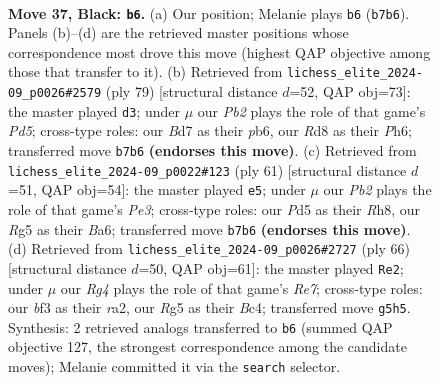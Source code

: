 \documentclass[11pt]{article}
\begin{document}
\clearpage

\begin{figure}[p]\centering
\begin{subfigure}{0.46\textwidth}\centering
\resizebox{\linewidth}{!}{%
\newchessgame
\chessboard[
  setfen={3r1k2/1p1b1p1p/8/p2p2r1/6P1/1P1K1B2/P4N1P/2R3R1 b - - 0 37},
  showmover=false,
  pgfstyle=straightmove, color=movearrow, markmove={b7-b6}
]}
\caption{}
\end{subfigure}\hfill
\begin{subfigure}{0.46\textwidth}\centering
\resizebox{\linewidth}{!}{%
\newchessgame
\chessboard[
  setfen={2r5/R1P1r1k1/1P5p/3B1p2/3ppp2/8/7P/2R3K1 b - - 0 40},
  showmover=false,
  pgfstyle=straightmove, color=movearrow, markmove={d4-d3}
]}
\caption{}
\end{subfigure}
\\[4pt]
\begin{subfigure}{0.46\textwidth}\centering
\resizebox{\linewidth}{!}{%
\newchessgame
\chessboard[
  setfen={7r/p3k3/b2pp2r/2p4P/2P2pP1/1P5K/P4N2/4RR2 b - - 0 31},
  showmover=false,
  pgfstyle=straightmove, color=movearrow, markmove={e6-e5}
]}
\caption{}
\end{subfigure}\hfill
\begin{subfigure}{0.46\textwidth}\centering
\resizebox{\linewidth}{!}{%
\newchessgame
\chessboard[
  setfen={5rk1/4Rp2/2Np2p1/2nP4/2B3P1/1p6/rP3P2/3R2K1 w - - 4 34},
  showmover=false,
  pgfstyle=straightmove, color=movearrow, markmove={e7-e2}
]}
\caption{}
\end{subfigure}
\caption{\textbf{Move 37, Black: \texttt{b6}.} (a) Our position; Melanie plays \texttt{b6} (\texttt{b7b6}). Panels (b)--(d) are the retrieved master positions whose correspondence most drove this move (highest QAP objective among those that transfer to it). (b) Retrieved from \texttt{lichess\_elite\_2024-09\_p0026\#2579} (ply 79) [structural distance $d$=52, QAP obj=73]: the master played \texttt{d3}; under $\mu$ our \emph{Pb2} plays the role of that game's \emph{Pd5}; cross-type roles: our \emph{B}d7 as their \emph{p}b6, our \emph{R}d8 as their \emph{P}h6; transferred move \texttt{b7b6} \textbf{(endorses this move)}. (c) Retrieved from \texttt{lichess\_elite\_2024-09\_p0022\#123} (ply 61) [structural distance $d$=51, QAP obj=54]: the master played \texttt{e5}; under $\mu$ our \emph{Pb2} plays the role of that game's \emph{Pe3}; cross-type roles: our \emph{P}d5 as their \emph{R}h8, our \emph{R}g5 as their \emph{B}a6; transferred move \texttt{b7b6} \textbf{(endorses this move)}. (d) Retrieved from \texttt{lichess\_elite\_2024-09\_p0026\#2727} (ply 66) [structural distance $d$=50, QAP obj=61]: the master played \texttt{Re2}; under $\mu$ our \emph{Rg4} plays the role of that game's \emph{Re7}; cross-type roles: our \emph{b}f3 as their \emph{r}a2, our \emph{R}g5 as their \emph{B}c4; transferred move \texttt{g5h5}. Synthesis: 2 retrieved analogs transferred to \texttt{b6} (summed QAP objective 127, the strongest correspondence among the candidate moves); Melanie committed it via the \texttt{search} selector.}
\label{fig:thought-m73}
\end{figure}
\end{document}
